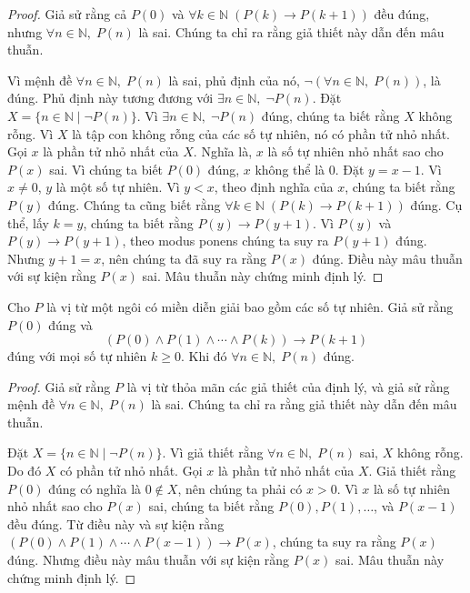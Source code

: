 \begin{proof}
Giả sử rằng cả $P(0)$ và $\forall k \in \mathbb{N}\;(P(k) \to P(k+1))$ đều đúng, nhưng $\forall n \in \mathbb{N},\; P(n)$ là sai. Chúng ta chỉ ra rằng giả thiết này dẫn đến mâu thuẫn.

Vì mệnh đề $\forall n \in \mathbb{N},\; P(n)$ là sai, phủ định của nó, $\neg(\forall n \in \mathbb{N},\; P(n))$, là đúng. Phủ định này tương đương với $\exists n \in \mathbb{N},\; \neg P(n)$. Đặt $X = \{n \in \mathbb{N} \mid \neg P(n)\}$. Vì $\exists n \in \mathbb{N},\; \neg P(n)$ đúng, chúng ta biết rằng $X$ không rỗng. Vì $X$ là tập con không rỗng của các số tự nhiên, nó có phần tử nhỏ nhất. Gọi $x$ là phần tử nhỏ nhất của $X$. Nghĩa là, $x$ là số tự nhiên nhỏ nhất sao cho $P(x)$ sai. Vì chúng ta biết $P(0)$ đúng, $x$ không thể là $0$. Đặt $y = x - 1$. Vì $x \neq 0$, $y$ là một số tự nhiên. Vì $y < x$, theo định nghĩa của $x$, chúng ta biết rằng $P(y)$ đúng. Chúng ta cũng biết rằng $\forall k \in \mathbb{N}\;(P(k) \to P(k+1))$ đúng. Cụ thể, lấy $k = y$, chúng ta biết rằng $P(y) \to P(y+1)$. Vì $P(y)$ và $P(y) \to P(y+1)$, theo modus ponens chúng ta suy ra $P(y+1)$ đúng. Nhưng $y + 1 = x$, nên chúng ta đã suy ra rằng $P(x)$ đúng. Điều này mâu thuẫn với sự kiện rằng $P(x)$ sai. Mâu thuẫn này chứng minh định lý.
\end{proof}

\begin{theorem}
\label{thm:4.4}
Cho $P$ là vị từ một ngôi có miền diễn giải bao gồm các số tự nhiên. Giả sử rằng $P(0)$ đúng và
\[
(P(0) \land P(1) \land \cdots \land P(k)) \to P(k+1)
\]
đúng với mọi số tự nhiên $k \geq 0$. Khi đó $\forall n \in \mathbb{N},\; P(n)$ đúng.
\end{theorem}

\begin{proof}
Giả sử rằng $P$ là vị từ thỏa mãn các giả thiết của định lý, và giả sử rằng mệnh đề $\forall n \in \mathbb{N},\; P(n)$ là sai. Chúng ta chỉ ra rằng giả thiết này dẫn đến mâu thuẫn.

Đặt $X = \{n \in \mathbb{N} \mid \neg P(n)\}$. Vì giả thiết rằng $\forall n \in \mathbb{N},\; P(n)$ sai, $X$ không rỗng. Do đó $X$ có phần tử nhỏ nhất. Gọi $x$ là phần tử nhỏ nhất của $X$. Giả thiết rằng $P(0)$ đúng có nghĩa là $0 \notin X$, nên chúng ta phải có $x > 0$. Vì $x$ là số tự nhiên nhỏ nhất sao cho $P(x)$ sai, chúng ta biết rằng $P(0), P(1), \ldots$, và $P(x-1)$ đều đúng. Từ điều này và sự kiện rằng $(P(0) \land P(1) \land \cdots \land P(x-1)) \to P(x)$, chúng ta suy ra rằng $P(x)$ đúng. Nhưng điều này mâu thuẫn với sự kiện rằng $P(x)$ sai. Mâu thuẫn này chứng minh định lý.
\end{proof}

